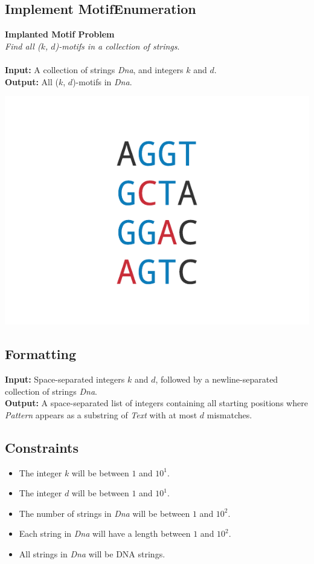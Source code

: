 \documentclass{article}
\begin{document}
\subsection{Implement MotifEnumeration}
\hline\vspace{5}
\noindent\textbf{Implanted Motif Problem}\\
\emph{Find all ($k$, $d$)-motifs in a collection of strings}.\\ \\
\textbf{Input:} A collection of strings \emph{Dna}, and integers $k$ and $d$.\\
\textbf{Output:} All ($k$, $d$)-motifs in \emph{Dna}.
\begin{center}
    \includegraphics[scale=0.2]{c2/logos/2A.png} 
\end{center}
\hline\vspace{5}

\subsection*{Formatting}
\textbf{Input:} Space-separated integers $k$ and $d$, followed by a newline-separated collection of strings \emph{Dna}.\\
\noindent\textbf{Output:} A space-separated list of integers containing all starting positions where \emph{Pattern} appears as a substring of \emph{Text} with at most $d$ mismatches.

\subsection*{Constraints}
\begin{itemize}
    \item The integer $k$ will be between $1$ and $10^1$.
    \item The integer $d$ will be between $1$ and $10^1$.
    \item The number of strings in \emph{Dna} will be between $1$ and $10^2$.
    \item Each string in \emph{Dna} will have a length between $1$ and $10^2$.
    \item All strings in \emph{Dna} will be DNA strings.
\end{itemize}
\pagebreak
\end{document}
